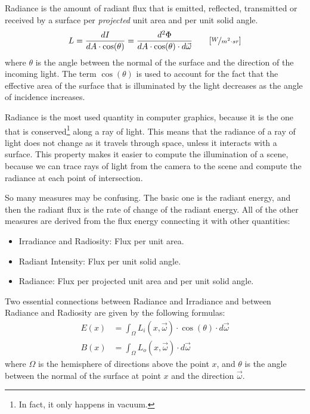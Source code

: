 \begin{definicion}[Radiance]
Radiance is the amount of radiant flux that is emitted, reflected, transmitted or received by a surface per \emph{projected} unit area and per unit solid angle.
\begin{equation*}
    L = \dfrac{dI}{dA \cdot \cos(\theta)} =
    \frac{d^2\Phi}{dA \cdot \cos(\theta) \cdot d\vec{\omega}} \qquad [\nicefrac{W}{m^2 \cdot sr}]
\end{equation*}
where $\theta$ is the angle between the normal of the surface and the direction of the incoming light. The term $\cos(\theta)$ is used to account for the fact that the effective area of the surface that is illuminated by the light decreases as the angle of incidence increases.
\end{definicion}
Radiance is the most used quantity in computer graphics, because it is the one that is conserved\footnote{In fact, it only happens in vacuum.} along a ray of light. This means that the radiance of a ray of light does not change as it travels through space, unless it interacts with a surface. This property makes it easier to compute the illumination of a scene, because we can trace rays of light from the camera to the scene and compute the radiance at each point of intersection.

\begin{observacion}
    So many measures may be confusing. The basic one is the radiant energy, and then the radiant flux is the rate of change of the radiant energy. All of the other measures are derived from the flux energy connecting it with other quantities:
\begin{itemize}
    \item Irradiance and Radiosity: Flux per unit area.
    \item Radiant Intensity: Flux per unit solid angle.
    \item Radiance: Flux per projected unit area and per unit solid angle.
\end{itemize}
\end{observacion}

Two essential connections between Radiance and Irradiance and between Radiance and Radiosity are given by the following formulas:
\begin{align}\label{eq:irradiance_radiance}
    E(x) &= \int_{\Omega} L_i(x, \vec{\omega}) \cdot \cos(\theta) \cdot d\vec{\omega} \\
    B(x) &= \int_{\Omega} L_o(x, \vec{\omega}) \cdot d\vec{\omega}
\end{align}
where $\Omega$ is the hemisphere of directions above the point $x$, and $\theta$ is the angle between the normal of the surface at point $x$ and the direction $\vec{\omega}$.

